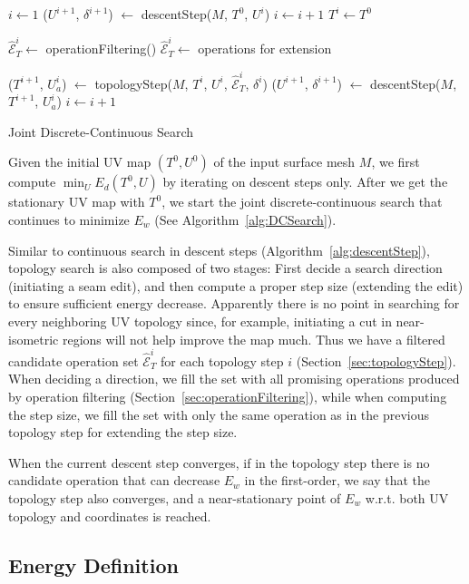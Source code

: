 \begin{algorithm}[h]
\SetAlgoLined
{}
$i \leftarrow 1$\;
{
	($U^{i+1}$, $\delta^{i+1}$) $\leftarrow$ descentStep($M$, $T^0$, $U^i$)\;
	$i \leftarrow i+1$\;
}
$T^i \leftarrow T^0$\;
{
	{
		$\hat{\mathcal{E}}^i_T \leftarrow$ operationFiltering()\;
	}
	{
		$\hat{\mathcal{E}}^i_T \leftarrow$ operations for extension\;
	}

	($T^{i+1}$, $U_a^{i}$) $\leftarrow$ topologyStep($M$, $T^i$, $U^i$, $\hat{\mathcal{E}}^i_T$, $\delta^i$)\;
	($U^{i+1}$, $\delta^{i+1}$) $\leftarrow$ descentStep($M$, $T^{i+1}$, $U_a^i$)\;
	$i \leftarrow i+1$\;
}
\caption{Joint Discrete-Continuous Search}
\label{alg:DCSearch}
\end{algorithm}

Given the initial UV map $(T^0, U^0)$ of the input surface mesh $M$, we first compute $\min_U E_d(T^0,U)$ by iterating on descent steps only. After we get the stationary UV map with $T^0$, we start the joint discrete-continuous search that continues to minimize $E_w$ (See Algorithm~\ref{alg:DCSearch}). 

Similar to continuous search in descent steps (Algorithm~\ref{alg:descentStep}), topology search is also composed of two stages: First decide a search direction (initiating a seam edit), and then compute a proper step size (extending the edit) to ensure sufficient energy decrease.  Apparently there is no point in searching for every neighboring UV topology since, for example, initiating a cut in near-isometric regions will not help improve the map much. Thus we have a filtered candidate operation set $\hat{\mathcal{E}}^i_T$ for each topology step $i$ (Section~\ref{sec:topologyStep}). When deciding a direction, we fill the set with all promising operations produced by operation filtering (Section~\ref{sec:operationFiltering}), while when computing the step size, we fill the set with only the same operation as in the previous topology step for extending the step size.

When the current descent step converges, if in the topology step there is no candidate operation that can decrease $E_w$ in the first-order, we say that the topology step also converges, and a near-stationary point of $E_w$ w.r.t. both UV topology and coordinates is reached. 

\subsection{Energy Definition}

